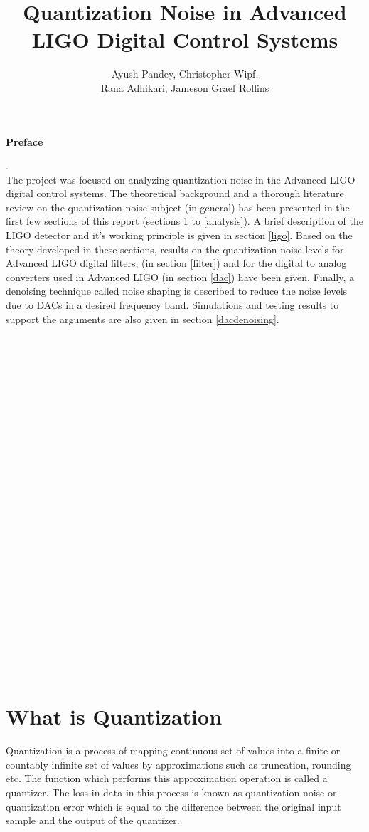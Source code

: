\documentclass[colorlinks=true,pdfstartview=FitV,linkcolor=blue,
            citecolor=red,urlcolor=magenta]{ligodoc}
\title{Quantization Noise in Advanced LIGO Digital Control Systems}
\author{Ayush Pandey, Christopher Wipf, \\Rana Adhikari, Jameson Graef Rollins}
\begin{document}
\begin{center}
\textbf{\LARGE{Preface}}
\end{center}
.\\[2\baselineskip]

The project was focused on analyzing quantization noise in the Advanced LIGO digital control systems. The theoretical background and a thorough literature review on the quantization noise subject (in general) has been presented in the first few sections of this report (sections \ref{quant} to \ref{analysis}). A brief description of the LIGO detector and it's working principle is given in section \ref{ligo}. Based on the theory developed in these sections, results on the quantization noise levels for Advanced LIGO digital filters, (in section \ref{filter}) and for the digital to analog converters used in Advanced LIGO (in section \ref{dac}) have been given. Finally, a denoising technique called noise shaping is described to reduce the noise levels due to DACs in a desired frequency band. Simulations and testing results to support the arguments are also given in section \ref{dacdenoising}. \\
\\\\\\\\\\\\\\\\\\\\\\\\\\\\\\\\\\\\\\\\\\\\\\\\\\
\section{What is Quantization}
\label{quant}
Quantization is a process of mapping continuous set of values into a finite or countably infinite set of values by approximations such as truncation, rounding etc. The function which performs this approximation operation is called a quantizer. The loss in data in this process is known as quantization noise or quantization error which is equal to the difference between the original input sample and the output of the quantizer. 
\end{document}

